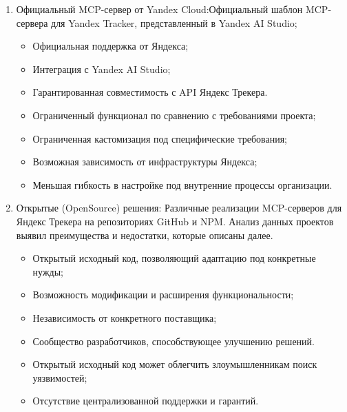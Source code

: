 \documentclass[utf8, russian]{eskdtext}
\begin{document}
\begin{enumerate}
\item{ Официальный MCP-сервер от Yandex Cloud:Официальный шаблон MCP-сервера для Yandex Tracker, представленный в Yandex AI Studio;}
 
\begin{itemize}
    \item Официальная поддержка от Яндекса;
    \item Интеграция с Yandex AI Studio;
    \item Гарантированная совместимость с API Яндекс Трекера.
\end{itemize}
 
\begin{itemize}
    \item Ограниченный функционал по сравнению с требованиями проекта;
    \item Ограниченная кастомизация под специфические требования;
    \item Возможная зависимость от инфраструктуры Яндекса;
    \item Меньшая гибкость в настройке под внутренние процессы организации.
\end{itemize}
 
\item{Открытые (OpenSource) решения:}
Различные реализации MCP-серверов для Яндекс Трекера на репозиториях GitHub и NPM. Анализ данных проектов выявил преимущества и недостатки, которые описаны далее.
 
\begin{itemize}
    \item Открытый исходный код, позволяющий адаптацию под конкретные нужды;
    \item Возможность модификации и расширения функциональности;
    \item Независимость от конкретного поставщика;
    \item Сообщество разработчиков, способствующее улучшению решений.
\end{itemize}
 
\begin{itemize}
    \item Открытый исходный код может облегчить злоумышленникам поиск уязвимостей;
    \item Отсутствие централизованной поддержки и гарантий.
\end{itemize}
\end{enumerate}
\end{document}
